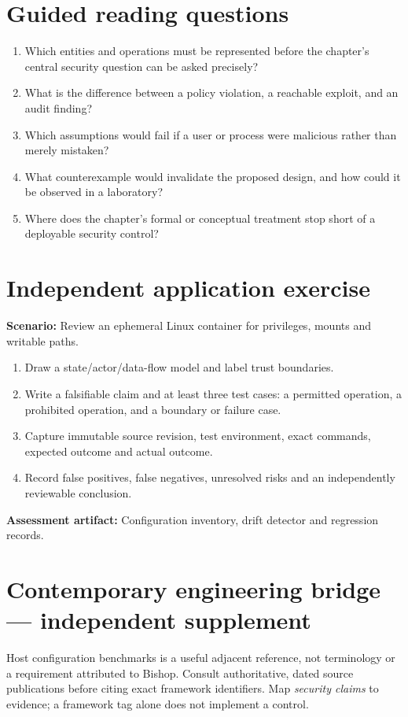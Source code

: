 \documentclass[10pt,letterpaper]{article}
\begin{document}
\section{Guided reading questions}
\begin{enumerate}
\item Which entities and operations must be represented before the chapter's central security question can be asked precisely?
\item What is the difference between a policy violation, a reachable exploit, and an audit finding?
\item Which assumptions would fail if a user or process were malicious rather than merely mistaken?
\item What counterexample would invalidate the proposed design, and how could it be observed in a laboratory?
\item Where does the chapter's formal or conceptual treatment stop short of a deployable security control?
\end{enumerate}
\section{Independent application exercise}
\textbf{Scenario:} Review an ephemeral Linux container for privileges, mounts and writable paths.
\begin{enumerate}
\item Draw a state/actor/data-flow model and label trust boundaries.
\item Write a falsifiable claim and at least three test cases: a permitted operation, a prohibited operation, and a boundary or failure case.
\item Capture immutable source revision, test environment, exact commands, expected outcome and actual outcome.
\item Record false positives, false negatives, unresolved risks and an independently reviewable conclusion.
\end{enumerate}
\textbf{Assessment artifact:} Configuration inventory, drift detector and regression records.
\section{Contemporary engineering bridge --- independent supplement}
Host configuration benchmarks is a useful adjacent reference, not terminology or a requirement attributed to Bishop. Consult authoritative, dated source publications before citing exact framework identifiers. Map \emph{security claims} to evidence; a framework tag alone does not implement a control.
\end{document}
